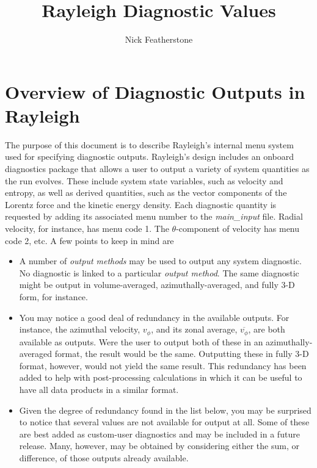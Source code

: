 \documentclass[10pt, letterpaper]{article}
\begin{document}
\title{Rayleigh Diagnostic Values}
\author{Nick Featherstone}

\maketitle


\section{Overview of Diagnostic Outputs in Rayleigh}
The purpose of this document is to describe Rayleigh's internal menu system used for specifying diagnostic outputs.  Rayleigh's design includes an onboard diagnostics package that allows a user to output a variety of system quantities as the run evolves.  These include system state variables, such as velocity and entropy, as well as derived quantities, such as the vector components of the Lorentz force and the kinetic energy density.  Each diagnostic quantity is requested by adding its associated menu number to the \textit{main\_input} file.  Radial velocity, for instance, has menu code 1.  The $\theta$-component of velocity has menu code 2, etc.    A few points to keep in mind are
\begin{itemize}
\item A number of \textit{output methods} may be used to output any system diagnostic.  No diagnostic is linked to a particular \textit{output method}.  The same diagnostic might be output in volume-averaged, azimuthally-averaged, and fully 3-D form, for instance.
\item You may notice a good deal of redundancy in the available outputs.  For instance, the azimuthal velocity, $v_\phi$, and its zonal average, $\overline{v_\phi}$, are both available as outputs.  Were the user to output both of these in an azimuthally-averaged format, the result would be the same.  Outputting these in fully 3-D format, however, would not yield the same result.  This redundancy has been added to help with post-processing calculations in which it can be useful to have all data products in a similar format.
\item Given the degree of redundancy found in the list below, you may be surprised to notice that several values are not available for output at all.  Some of these are best added as custom-user diagnostics and may be included in a future release.  Many, however, may be obtained by considering either the sum, or difference, of those outputs already available.

\end{itemize}  
 
\end{document}
